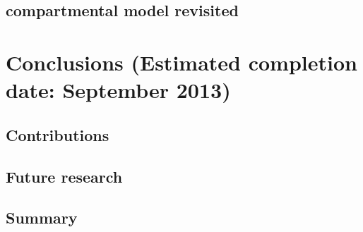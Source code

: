 \documentclass[11pt, bib, fontset = Minion]{marticle}
\def\finish#1{(Estimated completion date: #1 2013)}
\begin{document}
\subsection{\pet compartmental model revisited}

\section{Conclusions \finish{September}}

\subsection{Contributions}

\subsection{Future research}

\subsection{Summary}

\printbibliography[heading=reference]
\end{document}
